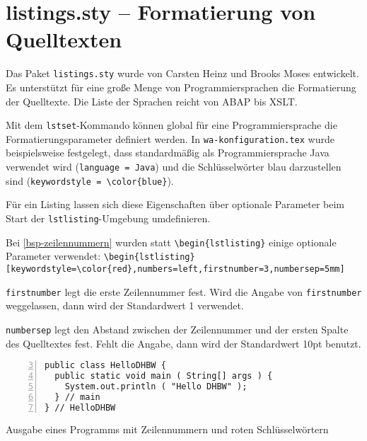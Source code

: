 \clearpage
\section{listings.sty -- Formatierung von Quelltexten}

Das Paket \texttt{listings.sty} wurde von Carsten Heinz und Brooks Moses entwickelt. Es unterst\"utzt f\"ur eine gro{\ss}e 
Menge von Programmiersprachen die Formatierung der Quelltexte. Die Liste der Sprachen reicht von 
ABAP bis XSLT.

Mit dem \texttt{lstset}-Kommando k\"onnen global f\"ur eine Programmiersprache die Formatierungsparameter definiert werden.
In \texttt{wa-konfiguration.tex} wurde beispielsweise festgelegt, dass standardm\"a{\ss}ig als Programmiersprache Java verwendet 
wird (\verb+language = Java+) und die Schl\"usselw\"orter blau darzustellen sind (\texttt{keywordstyle = \textbackslash{}color\{blue\}}).

F\"ur ein Listing lassen sich diese Eigenschaften \"uber optionale Parameter beim Start 
der \verb+lstlisting+-Umgebung umdefinieren. 


Bei \vref{bsp-zeilennummern} wurden statt \verb+\begin{lstlisting}+ einige optionale Parameter verwendet: \newline
\verb+\begin{lstlisting}[keywordstyle=\color{red},numbers=left,+\newline\verb+firstnumber=3,numbersep=5mm]+

\begin{seList}
\item \verb+firstnumber+ legt die erste Zeilennummer fest. Wird die Angabe von \verb+firstnumber+ weggelassen, 
dann wird der Standardwert 1 verwendet.
\item \verb+numbersep+ legt den Abstand zwischen der Zeilennummer und der ersten Spalte des Quelltextes fest. 
Fehlt die Angabe, dann wird der Standardwert 10pt benutzt.
\end{seList}

\begin{programm}[htbp]
\begin{lstlisting}[keywordstyle=\color{red},numbers=left,
firstnumber=3,numbersep=5mm]
public class HelloDHBW {
  public static void main ( String[] args ) {
    System.out.println ( "Hello DHBW" );
  } // main
} // HelloDHBW
\end{lstlisting}
\caption{Ausgabe eines Programms mit Zeilennummern und roten Schl\"usselw\"ortern\label{bsp-zeilennummern}}
\end{programm}

